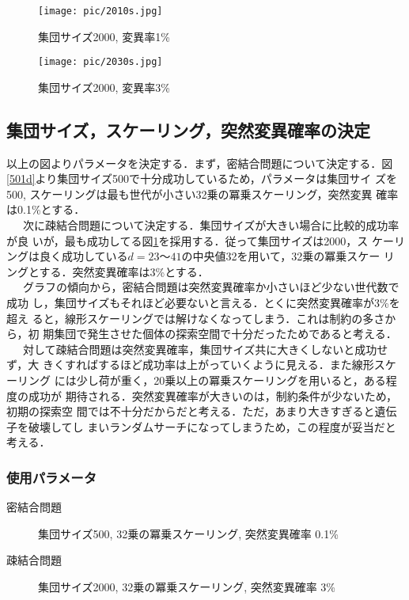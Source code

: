 \documentclass[a4j]{jarticle}
\begin{document}
\begin{figure}[htb]
 \begin{minipage}{0.5\hsize}
  \begin{center}
  \texttt{[image: pic/2010s.jpg]}
  \end{center}
  \caption{集団サイズ2000, 変異率1\%}
  \label{2010s}
 \end{minipage}
 \begin{minipage}{0.5\hsize}
  \begin{center}
  \texttt{[image: pic/2030s.jpg]}
  \end{center}
  \caption{集団サイズ2000, 変異率3\%}
  \label{2030s}
 \end{minipage}
\end{figure}


\clearpage
\subsection*{集団サイズ，スケーリング，突然変異確率の決定}
以上の図よりパラメータを決定する．まず，密結合問題について決定する．図
\ref{501d}より集団サイズ500で十分成功しているため，パラメータは集団サイ
ズを500, スケーリングは最も世代が小さい32乗の冪乗スケーリング，突然変異
確率は0.1\%とする．\\\ \ \ 
次に疎結合問題について決定する．集団サイズが大きい場合に比較的成功率が良
いが，最も成功してる図\ref{2030s}を採用する．従って集団サイズは2000，ス
ケーリングは良く成功している$d=23〜41$の中央値32を用いて，32乗の冪乗スケー
リングとする．突然変異確率は3\%とする．\\\ \ \ 
グラフの傾向から，密結合問題は突然変異確率か小さいほど少ない世代数で成功
し，集団サイズもそれほど必要ないと言える．とくに突然変異確率が3\%を超え
ると，線形スケーリングでは解けなくなってしまう．これは制約の多さから，初
期集団で発生させた個体の探索空間で十分だったためであると考える．\\\ \ \ 
対して疎結合問題は突然変異確率，集団サイズ共に大きくしないと成功せず，大
きくすればするほど成功率は上がっていくように見える．また線形スケーリング
には少し荷が重く，20乗以上の冪乗スケーリングを用いると，ある程度の成功が
期待される．突然変異確率が大きいのは，制約条件が少ないため，初期の探索空
間では不十分だからだと考える．ただ，あまり大きすぎると遺伝子を破壊してし
まいランダムサーチになってしまうため，この程度が妥当だと考える．
\subsubsection*{使用パラメータ}
\begin{description}
 \item[密結合問題]集団サイズ500, 32乗の冪乗スケーリング, 突然変異確率
	    0.1\% 
 \item[疎結合問題]集団サイズ2000, 32乗の冪乗スケーリング, 突然変異確率
	    3\%  
\end{description}
\end{document}
